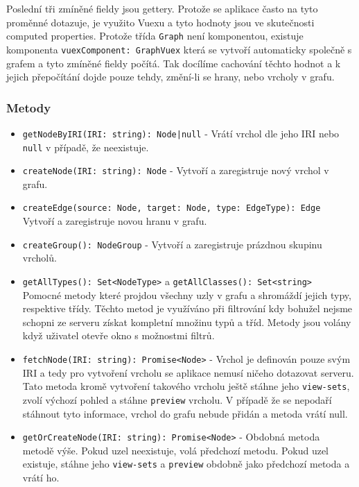 Poslední tři zmíněné fieldy jsou gettery. Protože se aplikace často na tyto proměnné dotazuje, je využito Vuexu a tyto hodnoty jsou ve skutečnosti computed properties. Protože třída \texttt{Graph} není komponentou, existuje komponenta \texttt{vuexComponent: GraphVuex} která se vytvoří automaticky společně s grafem a tyto zmíněné fieldy počítá. Tak docílíme cachování těchto hodnot a k jejich přepočítání dojde pouze tehdy, změní-li se hrany, nebo vrcholy v grafu.

\subsubsection*{Metody}
\begin{itemize}
  \item \texttt{getNodeByIRI(IRI: string): Node|null} - Vrátí vrchol dle jeho IRI nebo \texttt{null} v případě, že neexistuje.

  \item \texttt{createNode(IRI: string): Node} - Vytvoří a zaregistruje nový vrchol v grafu.
  \item \texttt{createEdge(source: Node, target: Node, type: EdgeType): Edge}\mbox{}\\Vytvoří a zaregistruje novou hranu v grafu.
  \item \texttt{createGroup(): NodeGroup} - Vytvoří a zaregistruje prázdnou skupinu vrcholů.

  \item \texttt{getAllTypes(): Set<NodeType>} a \texttt{getAllClasses(): Set<string>}\mbox{}\\Pomocné metody které projdou všechny uzly v grafu a shromáždí jejich typy, respektive třídy. Těchto metod je využíváno při filtrování kdy bohužel nejsme schopni ze serveru získat kompletní množinu typů a tříd. Metody jsou volány když uživatel otevře okno s možnostmi filtrů.

  \item \texttt{fetchNode(IRI: string): Promise<Node>} - Vrchol je definován pouze svým IRI a tedy pro vytvoření vrcholu se aplikace nemusí ničeho dotazovat serveru. Tato metoda kromě vytvoření takového vrcholu ještě stáhne jeho \texttt{view-sets}, zvolí výchozí pohled a stáhne \texttt{preview} vrcholu. V případě že se nepodaří stáhnout tyto informace, vrchol do grafu nebude přidán a metoda vrátí null.

  \item \texttt{getOrCreateNode(IRI: string): Promise<Node>} - Obdobná metoda \\metodě výše. Pokud uzel neexistuje, volá předchozí metodu. Pokud uzel existuje, stáhne jeho \texttt{view-sets} a \texttt{preview} obdobně jako předchozí metoda a vrátí ho.
\end{itemize}

